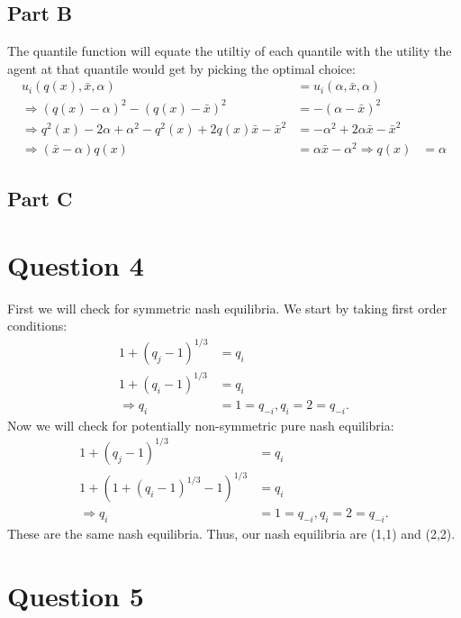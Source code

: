 \documentclass[11pt]{article} %
\begin{document}
\subsection{Part B}
The quantile function will equate the utiltiy of each quantile with the utility the agent at that quantile would get by picking the optimal choice:
\begin{align*}
u_i(q(x),\bar{x},\alpha) &= u_i(\alpha,\bar{x},\alpha)\\
\Rightarrow (q(x) - \alpha)^2 - (q(x) - \bar{x})^2 &= - (\alpha - \bar{x})^2\\
\Rightarrow q^2(x) - 2\alpha + \alpha^2 - q^2(x) + 2q(x)\bar{x} - \bar{x}^2 &= - \alpha^2 + 2\alpha\bar{x} - \bar{x}^2\\
\Rightarrow  ( \bar{x} - \alpha) q(x) &= \alpha \bar{x} - \alpha^2
\Rightarrow q(x) &= \alpha %
\end{align*}
\subsection{Part C}
\section{Question 4}
First we will check for symmetric nash equilibria. We start by taking first order conditions:
\begin{align*}
1+(q_j - 1)^{1/3} &= q_i\\
1+(q_i - 1)^{1/3} &= q_i\\
\Rightarrow q_i &= 1 = q_{-i}, q_i = 2 = q_{-i}.
\end{align*}
Now we will check for potentially non-symmetric pure nash equilibria:
\begin{align*}
1+(q_j - 1)^{1/3} &= q_i\\
1+(1+(q_i - 1)^{1/3} - 1)^{1/3} &= q_i\\
\Rightarrow q_i &= 1 = q_{-i}, q_i = 2 = q_{-i}.
\end{align*}
These are the same nash equilibria. Thus, our nash equilibria are (1,1) and (2,2). %
\section{Question 5}
\end{document}

